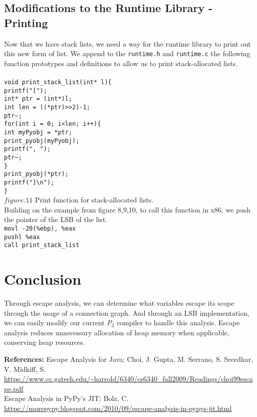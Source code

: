 \documentclass[11pt,article]{amsart}
\theoremstyle{definition}
\newcommand\tab[1][1cm]{\hspace*{#1}}
\numberwithin{equation}{subsection}
\begin{document}
\begin{multicols}{2}
\subsection{Modifications to the Runtime Library - Printing}
Now that we have stack lists, we need a way for the runtime library to print out this new form of list. We append to the \texttt{runtime.h} and \texttt{runtime.c} the following function prototypes and definitions to allow us to print stack-allocated lists. \\ \\
\texttt{void print\_stack\_list(int* l)\{}\\
\tab\texttt{printf("[");}\\
\tab\texttt{int* ptr = (int*)l;}\\
\tab\texttt{int len = ((*ptr)>>2)-1;}\\
\tab\texttt{ptr--;}\\
\tab\texttt{for(int i = 0; i<len; i++)\{}\\
\tab\tab\texttt{int myPyobj = *ptr;}\\
\tab\tab\texttt{print\_pyobj(myPyobj);}\\
\tab\tab\texttt{printf(", ");}\\
\tab\tab\texttt{ptr--;}\\
\tab\texttt{\}}\\
\tab\texttt{print\_pyobj(*ptr);}\\
\tab\texttt{printf("]\textbackslash n");}\\
\texttt{\}}\\
$figure.11$ Print function for stack-allocated lists. \\    
Building on the example from figure 8,9,10, to call this function in x86, we push the pointer of the LSB of the list. \\
\tab\texttt{movl -20(\%ebp), \%eax} \\
\tab\texttt{pushl \%eax} \\
\tab\texttt{call print\_stack\_list} \\

\section{Conclusion}
Through escape analysis, we can determine what variables escape its scope through the usage of a connection graph. And through an LSB implementation, we can easily modify our current $P_3$ compiler to handle this analysis. Escape analysis reduces unnecessary allocation of heap memory when applicable, conserving heap resources. 

\end{multicols}
\textbf{References:} 
Escape Analysis for Java;  Choi, J. Gupta, M.  Serrano, S. Sreedhar, V. Midkiff, S.
\url{https://www.cc.gatech.edu/~harrold/6340/cs6340_fall2009/Readings/choi99escape.pdf}\\
Escape Analysis in PyPy's JIT; Bolz, C. \\
\url{https://morepypy.blogspot.com/2010/09/escape-analysis-in-pypys-jit.html}
\end{document}
